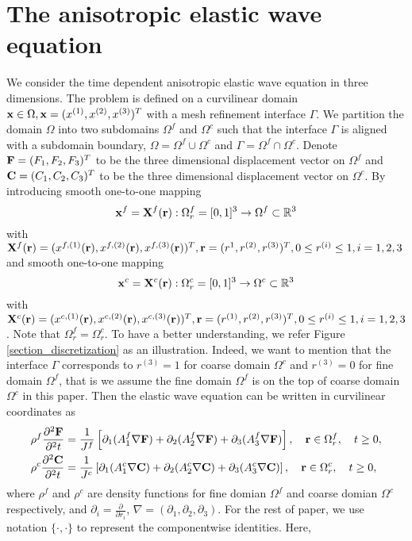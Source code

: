 \section{The anisotropic elastic wave equation }
We consider the time dependent anisotropic elastic wave equation in three dimensions. The problem is defined on a curvilinear domain ${\bf x}\in\Omega, {\bf x} = (x^{(1)},x^{(2)},x^{(3)})^T$ with a mesh refinement interface $\Gamma$.  We partition the domain $\Omega$ into two subdomains $\Omega^f$ and $\Omega^c$ such that the interface $\Gamma$ is aligned with a subdomain boundary, $\Omega = \Omega^f\cup\Omega^c$ and $\Gamma = \Omega^f\cap\Omega^c$. Denote ${\bf F} = (F_1,F_2,F_3)^T$ to be the three dimensional displacement vector on $\Omega^f$ and ${\bf C} = (C_1,C_2,C_3)^T$ to be the three dimensional displacement vector on $\Omega^c$. By introducing smooth one-to-one mapping
\[{\bf x}^{f} = {\bf X}^{f}({\bf r}) : \Omega^f_r = [0,1]^3 \rightarrow \Omega^{f} \subset \mathbb{R}^3 \]
with ${\bf X}^{f}({\bf r}) = (x^{f,(1)}({\bf r}),x^{f,(2)}({\bf r}),x^{f,(3)}({\bf r}))^T, {\bf r} = (r^{1},r^{(2)},r^{(3)})^T, 0\leq r^{(i)}\leq1, i = 1,2,3$
and smooth one-to-one mapping 
\[{\bf x}^{c} = {\bf X}^{c}({\bf r}) : \Omega^c_r = [0,1]^3 \rightarrow \Omega^{c} \subset \mathbb{R}^3\]
 with ${\bf X}^{c}({\bf r}) = (x^{c,(1)}({\bf r}),x^{c,(2)}({\bf r}),x^{c,(3)}({\bf r}))^T, {\bf r} = (r^{(1)},r^{(2)},r^{(3)})^T, 0\leq r^{(i)}\leq1, i = 1,2,3$. Note that $\Omega^f_r = \Omega^c_r$. To have a better understanding, we refer Figure \ref{section_discretization} as an illustration. Indeed, we want to mention that the interface $\Gamma$ corresponds to $r^{(3)} = 1$ for coarse domain $\Omega^c$ and $r^{(3)} = 0$ for fine domain $\Omega^f$, that is we assume the fine domain $\Omega^f$ is on the top of coarse domain $\Omega^c$ in this paper. Then the elastic wave equation can be written in curvilinear coordinates as
\begin{align}\label{elastic_curvi}
	\rho^f\frac{\partial^2{\bf F}}{\partial^2 t} &= \frac{1}{J^f}\left[\partial_1(A_1^f\nabla{\bf F}) + \partial_2(A_2^f\nabla{\bf F}) +\partial_3(A_3^f\nabla{\bf F}) \right], \ \ \  {\bf r}\in\Omega^f_r,\ \ \  t\geq0,\nonumber\\
	\rho^c\frac{\partial^2{\bf C}}{\partial^2 t} &= \frac{1}{J^c}\left[\partial_1(A_1^c\nabla{\bf C}) + \partial_2(A_2^c\nabla{\bf C}) +\partial_3(A_3^c\nabla{\bf C}) \right],\ \ \  {\bf r}\in\Omega^c_r,\ \ \  t\geq0,
\end{align}
where $\rho^f$ and $\rho^c$ are density functions for fine domian $\Omega^f$ and coarse domian $\Omega^c$ respectively, and $\partial_i = \frac{\partial}{\partial r_i}$, $\nabla = (\partial_1,\partial_2,\partial_3)$. For the rest of paper, we use notation $\{\cdot,\cdot\}$ to represent the componentwise identities. Here,
